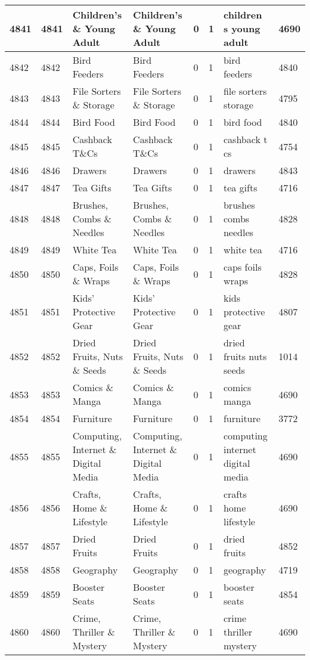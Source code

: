 \begin{longtable}{|l|l|l|l|l|l|l|l|}
4841 & 4841 & Children's \& Young Adult & Children's \& Young Adult & 0 & 1 & children s young adult & 4690 \\ \hline 
4842 & 4842 & Bird Feeders & Bird Feeders & 0 & 1 & bird feeders & 4840 \\ \hline 
4843 & 4843 & File Sorters \& Storage & File Sorters \& Storage & 0 & 1 & file sorters storage & 4795 \\ \hline 
4844 & 4844 & Bird Food & Bird Food & 0 & 1 & bird food & 4840 \\ \hline 
4845 & 4845 & Cashback T\&Cs & Cashback T\&Cs & 0 & 1 & cashback t cs & 4754 \\ \hline 
4846 & 4846 & Drawers & Drawers & 0 & 1 & drawers & 4843 \\ \hline 
4847 & 4847 & Tea Gifts & Tea Gifts & 0 & 1 & tea gifts & 4716 \\ \hline 
4848 & 4848 & Brushes, Combs \& Needles & Brushes, Combs \& Needles & 0 & 1 & brushes combs needles & 4828 \\ \hline 
4849 & 4849 & White Tea & White Tea & 0 & 1 & white tea & 4716 \\ \hline 
4850 & 4850 & Caps, Foils \& Wraps & Caps, Foils \& Wraps & 0 & 1 & caps foils wraps & 4828 \\ \hline 
4851 & 4851 & Kids' Protective Gear & Kids' Protective Gear & 0 & 1 & kids protective gear & 4807 \\ \hline 
4852 & 4852 & Dried Fruits, Nuts \& Seeds & Dried Fruits, Nuts \& Seeds & 0 & 1 & dried fruits nuts seeds & 1014 \\ \hline 
4853 & 4853 & Comics \& Manga & Comics \& Manga & 0 & 1 & comics manga & 4690 \\ \hline 
4854 & 4854 & Furniture & Furniture & 0 & 1 & furniture & 3772 \\ \hline 
4855 & 4855 & Computing, Internet \& Digital Media & Computing, Internet \& Digital Media & 0 & 1 & computing internet digital media & 4690 \\ \hline 
4856 & 4856 & Crafts, Home \& Lifestyle & Crafts, Home \& Lifestyle & 0 & 1 & crafts home lifestyle & 4690 \\ \hline 
4857 & 4857 & Dried Fruits & Dried Fruits & 0 & 1 & dried fruits & 4852 \\ \hline 
4858 & 4858 & Geography & Geography & 0 & 1 & geography & 4719 \\ \hline 
4859 & 4859 & Booster Seats & Booster Seats & 0 & 1 & booster seats & 4854 \\ \hline 
4860 & 4860 & Crime, Thriller \& Mystery & Crime, Thriller \& Mystery & 0 & 1 & crime thriller mystery & 4690 \\ \hline 

\end{longtable}
